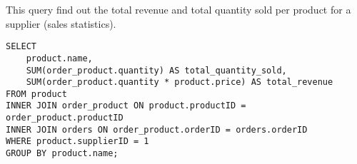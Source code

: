 This query find out the total revenue and total quantity sold per product for a supplier (sales statistics).

\begin{lstlisting}
SELECT
    product.name,
    SUM(order_product.quantity) AS total_quantity_sold,
    SUM(order_product.quantity * product.price) AS total_revenue
FROM product
INNER JOIN order_product ON product.productID = order_product.productID
INNER JOIN orders ON order_product.orderID = orders.orderID
WHERE product.supplierID = 1
GROUP BY product.name;
\end{lstlisting}